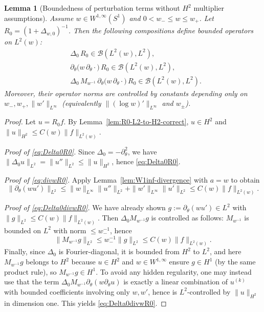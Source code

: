 \documentclass{amsart}
\numberwithin{equation}{section}
\newtheorem{lemma}[theorem]{Lemma}
\theoremstyle{definition}
\theoremstyle{remark}
\begin{document}
\begin{lemma}[Boundedness of perturbation terms without $H^2$ multiplier assumptions]
\label{lem:perturbation-boundedness-correct}
Assume $w\in W^{1,\infty}(S^1)$ and $0<w_-\le w\le w_+$.
Let $R_0=(1+\Delta_{w,0})^{-1}$.
Then the following compositions define bounded operators on $L^2(w)$:
\begin{align}
&\Delta_0\,R_0 \in \mathcal B(L^2(w),L^2),\label{eq:Delta0R0}\\
&\partial_\theta\big(w\,\partial_\theta \cdot\big)\,R_0 \in \mathcal B(L^2(w),L^2),\label{eq:divwR0}\\
&\Delta_0\,M_{w^{-1}}\,\partial_\theta\big(w\,\partial_\theta \cdot\big)\,R_0
\in \mathcal B(L^2(w),L^2).\label{eq:Delta0divwR0}
\end{align}
Moreover, their operator norms are controlled by constants depending only on
$w_-,w_+,\|w'\|_{L^\infty}$ (equivalently $\|(\log w)'\|_{L^\infty}$ and $w_\pm$).
\end{lemma}

\begin{proof}
Let $u=R_0 f$. By Lemma~\ref{lem:R0-L2-to-H2-correct}, $u\in H^2$ and
\(
\|u\|_{H^2}\le C(w)\|f\|_{L^2(w)}.
\)

\smallskip
\noindent\emph{Proof of \eqref{eq:Delta0R0}.}
Since $\Delta_0=-\partial_\theta^2$, we have
\(
\|\Delta_0 u\|_{L^2}=\|u''\|_{L^2}\le \|u\|_{H^2}
\),
hence \eqref{eq:Delta0R0}.

\smallskip
\noindent\emph{Proof of \eqref{eq:divwR0}.}
Apply Lemma~\ref{lem:W1inf-divergence} with $a=w$ to obtain
\[
\|\partial_\theta(wu')\|_{L^2}
\le \|w\|_{L^\infty}\|u''\|_{L^2}+\|w'\|_{L^\infty}\|u'\|_{L^2}
\le C(w)\|f\|_{L^2(w)}.
\]

\smallskip
\noindent\emph{Proof of \eqref{eq:Delta0divwR0}.}
We have already shown $g:=\partial_\theta(wu')\in L^2$ with $\|g\|_{L^2}\le C(w)\|f\|_{L^2(w)}$.
Then $\Delta_0 M_{w^{-1}} g$ is controlled as follows:
$M_{w^{-1}}$ is bounded on $L^2$ with norm $\le w_-^{-1}$, hence
\[
\|M_{w^{-1}}g\|_{L^2}\le w_-^{-1}\|g\|_{L^2}\le C(w)\|f\|_{L^2(w)}.
\]
Finally, since $\Delta_0$ is Fourier-diagonal, it is bounded from $H^2$ to $L^2$,
and here $M_{w^{-1}}g$ belongs to $H^2$ because $u\in H^2$ and $w\in W^{1,\infty}$
ensure $g\in H^1$ (by the same product rule), so $M_{w^{-1}}g\in H^1$.
To avoid any hidden regularity, one may instead use that the term
$\Delta_0 M_{w^{-1}}\partial_\theta(w\partial_\theta u)$ is exactly a linear
combination of $u^{(k)}$ with bounded coefficients involving only $w,w'$,
hence is $L^2$-controlled by $\|u\|_{H^2}$ in dimension one.
This yields \eqref{eq:Delta0divwR0}.
\end{proof}
\end{document}
